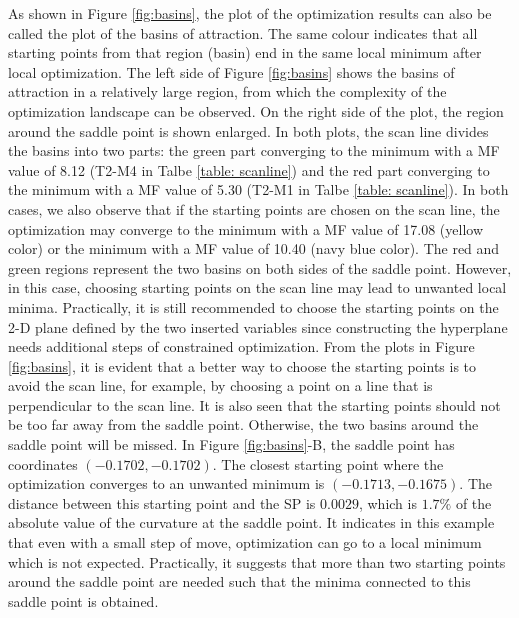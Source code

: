 As shown in Figure \ref{fig:basins}, the plot of the optimization results can also be called the plot of the basins of attraction. The same colour indicates that all starting points from that region (basin) end in the same local minimum after local optimization. The left side of Figure \ref{fig:basins} shows the basins of attraction in a relatively large region, from which the complexity of the optimization landscape can be observed. On the right side of the plot, the region around the saddle point is shown enlarged. In both plots, the scan line divides the basins into two parts: the green part converging to the minimum with a MF value of 8.12 (T2-M4 in Talbe \ref{table: scanline}) and the red part converging to the minimum with a MF value of 5.30 (T2-M1 in Talbe \ref{table: scanline}). In both cases, we also observe that if the starting points are chosen on the scan line, the optimization may converge to the minimum with a MF value of 17.08 (yellow color) or the minimum with a MF value of 10.40 (navy blue color). The red and green regions represent the two basins on both sides of the saddle point. However, in this case, choosing starting points on the scan line may lead to unwanted local minima. Practically, it is still recommended to choose the starting points on the 2-D plane defined by the two inserted variables since constructing the hyperplane needs additional steps of constrained optimization. From the plots in Figure \ref{fig:basins}, it is evident that a better way to choose the starting points is to avoid the scan line, for example, by choosing a point on a line that is perpendicular to the scan line. It is also seen that the starting points should not be too far away from the saddle point. Otherwise, the two basins around the saddle point will be missed. In Figure \ref{fig:basins}-B, the saddle point has coordinates $(-0.1702,-0.1702)$. The closest starting point where the optimization converges to an unwanted minimum is $(-0.1713, -0.1675)$. The distance between this starting point and the SP is $0.0029$, which is $1.7\%$ of the absolute value of the curvature at the saddle point. It indicates in this example that even with a small step of move, optimization can go to a local minimum which is not expected. Practically, it suggests that more than two starting points around the saddle point are needed such that the minima connected to this saddle point is obtained. 


